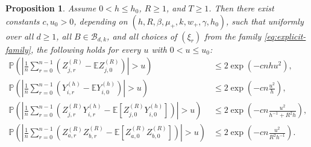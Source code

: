 \documentclass{article}
\newtheorem{proposition}{Proposition}[section]
\newcommand{\Pbb}{\mathbb{P}}
\begin{document}
\begin{proposition}
\label{prop:custom-bernstein}
Assume $0<h\le h_0$, $R\ge 1$, and $T\ge 1$. Then there exist constants $c,u_0>0$, depending on $(h,R,\beta,\mu_+,k,w_+,\gamma,h_0)$, such that uniformly over all $d\ge 1$, all $B\in\mathcal B_{d,k}$, and all choices of $(\xi_r)$ from the family \eqref{eq:explicit-family}, the following holds for every $u$ with $0<u\le u_0$:
\begin{align}
\Pbb\left(\left|\frac1n\sum_{r=0}^{n-1}(Z_{j,r}^{(R)}-\mathbb E Z_{j,0}^{(R)})\right|>u\right)
&\le 2\exp\left(-c n h u^2\right), \label{eq:conc-Z-main}\\
\Pbb\left(\left|\frac1n\sum_{r=0}^{n-1}(Y_{i,r}^{(h)}-\mathbb E Y_{i,0}^{(h)})\right|>u\right)
&\le 2\exp\left(-c n \frac{u^2}{h}\right), \label{eq:conc-Y-main}\\
\Pbb\left(\left|\frac1n\sum_{r=0}^{n-1}(Z_{j,r}^{(R)}Y_{i,r}^{(h)}-\mathbb E[Z_{j,0}^{(R)}Y_{i,0}^{(h)}])\right|>u\right)
&\le 2\exp\left(-c n\frac{u^2}{h^{-1}+R^2 h}\right), \label{eq:conc-ZY-main}\\
\Pbb\left(\left|\frac1n\sum_{r=0}^{n-1}(Z_{a,r}^{(R)}Z_{b,r}^{(R)}-\mathbb E[Z_{a,0}^{(R)}Z_{b,0}^{(R)}])\right|>u\right)
&\le 2\exp\left(-c n\frac{u^2}{R^2 h^{-1}}\right). \label{eq:conc-ZZ-main}
\end{align}
\end{proposition}
\end{document}
